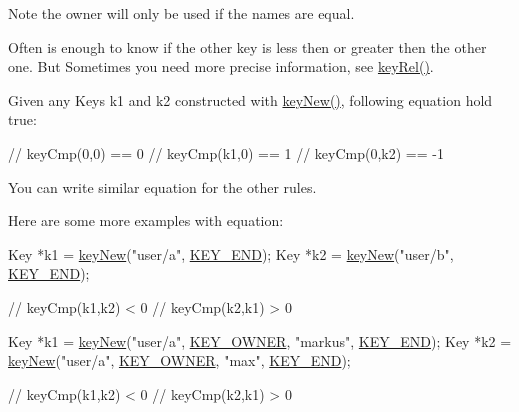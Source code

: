 \begin{DoxyNote}{Note}
the owner will only be used if the names are equal.
\end{DoxyNote}
Often is enough to know if the other key is less then or greater then the other one. But Sometimes you need more precise information, see \hyperlink{group__keytest_ga6bb0f95ac34ce9c42d61bb35a76139d0}{key\-Rel()}.

Given any Keys k1 and k2 constructed with \hyperlink{group__key_gaf6893c038b3ebee90c73a9ea8356bebf}{key\-New()}, following equation hold true\-:


\begin{DoxyCode}
\textcolor{comment}{// keyCmp(0,0) == 0}
\textcolor{comment}{// keyCmp(k1,0) ==  1}
\textcolor{comment}{// keyCmp(0,k2) == -1}
\end{DoxyCode}


You can write similar equation for the other rules.

Here are some more examples with equation\-: 
\begin{DoxyCode}
Key *k1 = \hyperlink{group__key_gaf6893c038b3ebee90c73a9ea8356bebf}{keyNew}(\textcolor{stringliteral}{"user/a"}, \hyperlink{group__key_gga91fb3178848bd682000958089abbaf40aa8adb6fcb92dec58fb19410eacfdd403}{KEY\_END});
Key *k2 = \hyperlink{group__key_gaf6893c038b3ebee90c73a9ea8356bebf}{keyNew}(\textcolor{stringliteral}{"user/b"}, \hyperlink{group__key_gga91fb3178848bd682000958089abbaf40aa8adb6fcb92dec58fb19410eacfdd403}{KEY\_END});

\textcolor{comment}{// keyCmp(k1,k2) < 0}
\textcolor{comment}{// keyCmp(k2,k1) > 0}
\end{DoxyCode}



\begin{DoxyCode}
Key *k1 = \hyperlink{group__key_gaf6893c038b3ebee90c73a9ea8356bebf}{keyNew}(\textcolor{stringliteral}{"user/a"}, \hyperlink{group__key_gga91fb3178848bd682000958089abbaf40a77ca60362fa8daca8d5347db4385068b}{KEY\_OWNER}, \textcolor{stringliteral}{"markus"}, \hyperlink{group__key_gga91fb3178848bd682000958089abbaf40aa8adb6fcb92dec58fb19410eacfdd403}{KEY\_END});
Key *k2 = \hyperlink{group__key_gaf6893c038b3ebee90c73a9ea8356bebf}{keyNew}(\textcolor{stringliteral}{"user/a"}, \hyperlink{group__key_gga91fb3178848bd682000958089abbaf40a77ca60362fa8daca8d5347db4385068b}{KEY\_OWNER}, \textcolor{stringliteral}{"max"}, \hyperlink{group__key_gga91fb3178848bd682000958089abbaf40aa8adb6fcb92dec58fb19410eacfdd403}{KEY\_END});

\textcolor{comment}{// keyCmp(k1,k2) < 0}
\textcolor{comment}{// keyCmp(k2,k1) > 0}
\end{DoxyCode}


